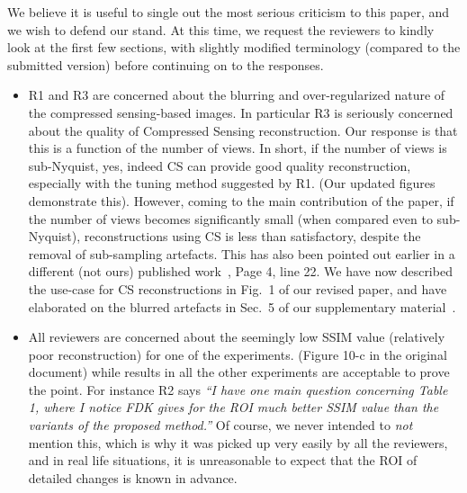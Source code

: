 \documentclass{article}
\begin{document}
We believe it is useful to single out the most serious criticism to this paper, and we wish to defend our stand. At this time, we request the reviewers  to kindly look at the first few sections, with slightly modified terminology (compared to the submitted version)  before continuing on to the responses. 

\begin{itemize}
  \item R1 and R3 are concerned about the blurring and over-regularized nature of the compressed sensing-based images.  In particular R3 is seriously concerned about the quality of Compressed Sensing reconstruction. Our response is that this is a function of the number of views. In short, if the number of views is sub-Nyquist, yes, indeed CS can provide good quality reconstruction, especially with the tuning method suggested by R1. (Our updated figures demonstrate this). 
However,  coming to the main contribution of the paper, if the number of views becomes significantly small (when compared even to sub-Nyquist), reconstructions using CS is less than satisfactory, despite the removal of sub-sampling artefacts. This has also been pointed out earlier in a different (not ours) published work~\cite{PICCS}, Page 4, line 22.  We have now described the use-case for CS reconstructions in Fig.~1 of our revised paper, and have elaborated on the blurred artefacts in Sec.~5 of our supplementary material~\cite{supp_paper}.
\item All reviewers are concerned about the seemingly low SSIM value (relatively poor reconstruction) for one of the experiments.  (Figure 10-c in the original document) while results in all the other experiments are acceptable to prove the point.  For instance R2 says \textit{``I have one main question concerning Table 1, where I notice FDK gives for the ROI much better SSIM value than the variants of the proposed method.'' } 
Of course, we never intended to \textit{not} mention this, which is why it was picked up very easily by all the reviewers, and in real life situations, it is unreasonable to expect that the ROI of detailed changes is known in advance. 


\end{itemize}
\end{document}
